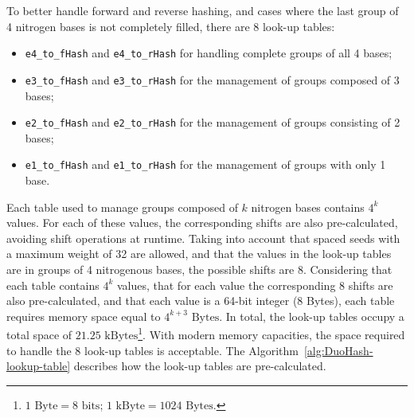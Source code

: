 To better handle forward and reverse hashing, and cases where the last group of 4 nitrogen bases is not completely filled, there are 8 look-up tables:
\begin{itemize}
	\item \verb|e4_to_fHash| and \verb|e4_to_rHash| for handling complete groups of all 4 bases;
	\item \verb|e3_to_fHash| and \verb|e3_to_rHash| for the management of groups composed of 3 bases;
	\item \verb|e2_to_fHash| and \verb|e2_to_rHash| for the management of groups consisting of 2 bases;
	\item \verb|e1_to_fHash| and \verb|e1_to_rHash| for the management of groups with only 1 base.
\end{itemize}

Each table used to manage groups composed of $k$ nitrogen bases contains $4^k$ values. For each of these values, the corresponding shifts are also pre-calculated, avoiding shift operations at runtime. Taking into account that spaced seeds with a maximum weight of 32 are allowed, and that the values in the look-up tables are in groups of 4 nitrogenous bases, the possible shifts are 8. Considering that each table contains $4^k$ values, that for each value the corresponding 8 shifts are also pre-calculated, and that each value is a 64-bit integer (8 Bytes), each table requires memory space equal to $4^{k + 3} \text{ Bytes}$. In total, the look-up tables occupy a total space of $21.25 \text{ kBytes}$\footnote{$1 \text{ Byte} = 8 \text{ bits}$; $1 \text{ kByte} = 1024 \text{ Bytes}$.}. With modern memory capacities, the space required to handle the 8 look-up tables is acceptable. The Algorithm~\ref{alg:DuoHash-lookup-table} describes how the look-up tables are pre-calculated.

